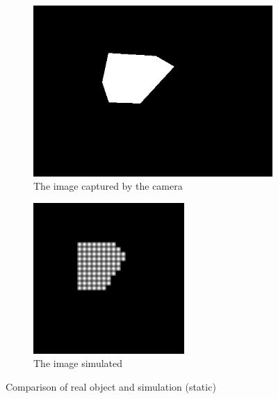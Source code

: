 \documentclass[]{article}
\begin{document}
\begin{figure}[h] %
	\centering
	
	\begin{subfigure}{0.45\textwidth}
		\centering
		\includegraphics[width=\textwidth]{first_orig_frame.png}
		\caption{The image captured by the camera}
		\label{compare_images:orig}
	\end{subfigure}
	\hfill
	\begin{subfigure}{0.45\textwidth}
		\centering
		\includegraphics[width=\textwidth]{first_simulated_frame.png}
		\caption{The image simulated}
		\label{compare_images:analysed}
	\end{subfigure}
	
	\caption{Comparison of real object and simulation (static)}
	\label{fig:image_comparison}
\end{figure}
\end{document}
